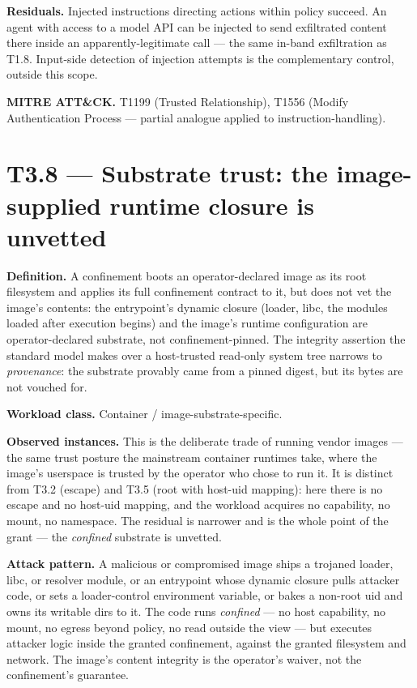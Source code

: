 \textbf{Residuals.} Injected instructions directing actions within
policy succeed. An agent with access to a model API can be injected to
send exfiltrated content there inside an apparently-legitimate call ---
the same in-band exfiltration as T1.8. Input-side detection of injection
attempts is the complementary control, outside this scope.

\textbf{MITRE ATT\&CK.} T1199 (Trusted Relationship), T1556 (Modify
Authentication Process --- partial analogue applied to
instruction-handling).

\hypertarget{t3.8-substrate-trust-the-image-supplied-runtime-closure-is-unvetted}{%
\section{T3.8 --- Substrate trust: the image-supplied runtime closure is
unvetted}\label{t3.8-substrate-trust-the-image-supplied-runtime-closure-is-unvetted}}

\textbf{Definition.} A confinement boots an operator-declared image as
its root filesystem and applies its full confinement contract to it, but
does not vet the image's contents: the entrypoint's dynamic closure
(loader, libc, the modules loaded after execution begins) and the
image's runtime configuration are operator-declared substrate, not
confinement-pinned. The integrity assertion the standard model makes
over a host-trusted read-only system tree narrows to \emph{provenance}:
the substrate provably came from a pinned digest, but its bytes are not
vouched for.

\textbf{Workload class.} Container / image-substrate-specific.

\textbf{Observed instances.} This is the deliberate trade of running
vendor images --- the same trust posture the mainstream container
runtimes take, where the image's userspace is trusted by the operator
who chose to run it. It is distinct from T3.2 (escape) and T3.5 (root
with host-uid mapping): here there is no escape and no host-uid mapping,
and the workload acquires no capability, no mount, no namespace. The
residual is narrower and is the whole point of the grant --- the
\emph{confined} substrate is unvetted.

\textbf{Attack pattern.} A malicious or compromised image ships a
trojaned loader, libc, or resolver module, or an entrypoint whose
dynamic closure pulls attacker code, or sets a loader-control
environment variable, or bakes a non-root uid and owns its writable dirs
to it. The code runs \emph{confined} --- no host capability, no mount,
no egress beyond policy, no read outside the view --- but executes
attacker logic inside the granted confinement, against the granted
filesystem and network. The image's content integrity is the operator's
waiver, not the confinement's guarantee.


